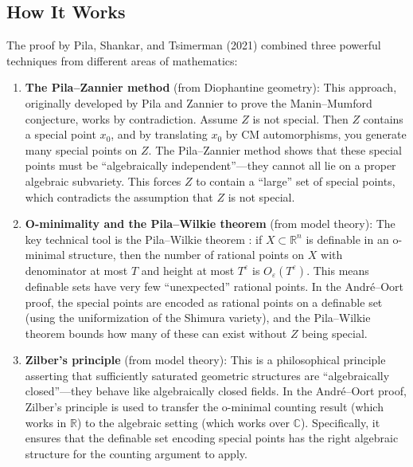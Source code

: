\subsection{How It Works}

The proof by Pila, Shankar, and Tsimerman (2021) \cite{pilatsimerman2021} combined three powerful techniques from different areas of mathematics:

\begin{enumerate}
\item \textbf{The Pila--Zannier method} (from Diophantine geometry): This approach, originally developed by Pila and Zannier to prove the Manin--Mumford conjecture, works by contradiction. Assume $Z$ is not special. Then $Z$ contains a special point $x_0$, and by translating $x_0$ by CM automorphisms, you generate many special points on $Z$. The Pila--Zannier method shows that these special points must be ``algebraically independent''---they cannot all lie on a proper algebraic subvariety. This forces $Z$ to contain a ``large'' set of special points, which contradicts the assumption that $Z$ is not special.

\item \textbf{O-minimality and the Pila--Wilkie theorem} (from model theory): The key technical tool is the Pila--Wilkie theorem \cite{pilawilkie2006}: if $X \subset \mathbb{R}^n$ is definable in an o-minimal structure, then the number of rational points on $X$ with denominator at most $T$ and height at most $T^\varepsilon$ is $O_\varepsilon(T^\varepsilon)$. This means definable sets have very few ``unexpected'' rational points. In the Andr\'{e}--Oort proof, the special points are encoded as rational points on a definable set (using the uniformization of the Shimura variety), and the Pila--Wilkie theorem bounds how many of these can exist without $Z$ being special.

\item \textbf{Zilber's principle} (from model theory): This is a philosophical principle asserting that sufficiently saturated geometric structures are ``algebraically closed''---they behave like algebraically closed fields. In the Andr\'{e}--Oort proof, Zilber's principle is used to transfer the o-minimal counting result (which works in $\mathbb{R}$) to the algebraic setting (which works over $\mathbb{C}$). Specifically, it ensures that the definable set encoding special points has the right algebraic structure for the counting argument to apply.
\end{enumerate}

